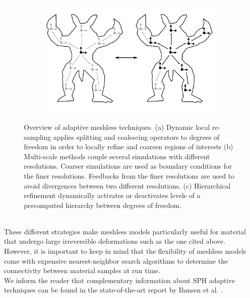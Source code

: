 \begin{figure}[t]
\begin{subfigure}[b]{0.3\linewidth}
		\includegraphics[width=\linewidth]{images/starAdaptivity-cgf2016/particles-hierarchy.png}
		\caption{\label{fig:meshless-hierarchy}}
	\end{subfigure}
	\caption[STAR adaptivity: Meshless techniques]{\label{fig:particleOverview}
		Overview of adaptive meshless techniques.
		(a) Dynamic local re-sampling applies splitting and coalescing operators to degrees of freedom in order to locally refine and coarsen regions of interests (b) Multi-scale methods couple several simulations with different resolutions. Coarser simulations are used as boundary conditions for the finer resolutions. Feedbacks from the finer resolutions are used to avoid divergences between two different resolutions. (c) Hierarchical refinement dynamically activates or deactivates levels of a precomputed hierarchy between degrees of freedom.}
\end{figure}
\\
These different strategies make meshless models particularly useful for material that undergo large irreversible deformations such as the one cited above. However, it is important to keep in mind that the flexibility of meshless models come with expensive nearest-neighbor search algorithms to determine the connectivity between material samples at run time.
\\
We inform the reader that complementary information about SPH adaptive techniques can be found in the state-of-the-art report by Ihmsen et al. \cite{Ihmsen2014:STAR}.

